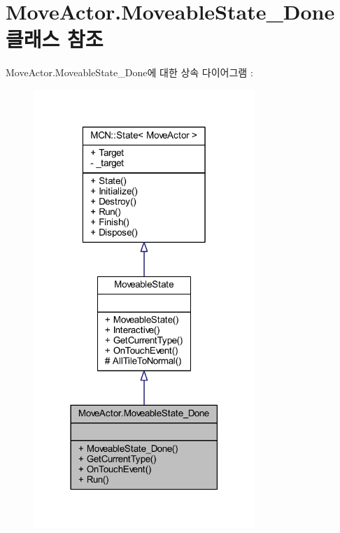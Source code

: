 \hypertarget{class_move_actor_1_1_moveable_state___done}{}\section{Move\+Actor.\+Moveable\+State\+\_\+\+Done 클래스 참조}
\label{class_move_actor_1_1_moveable_state___done}


Move\+Actor.\+Moveable\+State\+\_\+\+Done에 대한 상속 다이어그램 \+: \nopagebreak
\begin{figure}[H]
\begin{center}
\leavevmode
\includegraphics[width=237pt]{class_move_actor_1_1_moveable_state___done__inherit__graph}
\end{center}
\end{figure}


